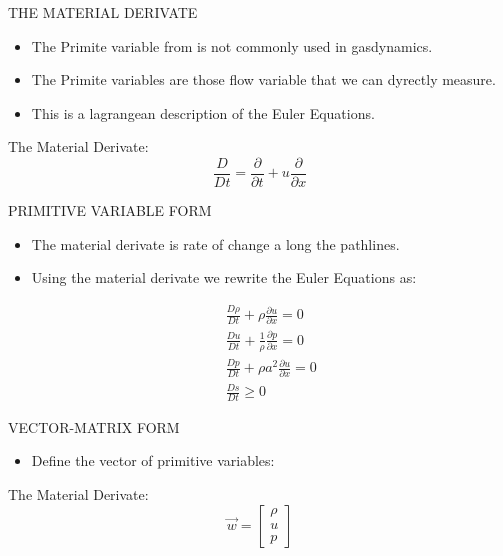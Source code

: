 \documentclass{beamer}
\begin{document}
\begin{frame}{THE MATERIAL DERIVATE}
  \begin{itemize}
   \item The Primite variable from is not commonly used in gasdynamics. 
   \item The Primite variables are those flow variable that we can dyrectly measure.
   \item This is a lagrangean description of the Euler Equations.
  \end{itemize}
The Material Derivate:
  \begin{equation}
   \frac{D}{Dt}=\frac{\partial}{\partial{t}}+u\frac{\partial}{\partial{x}}
  \end{equation}
\end{frame}

\begin{frame}{PRIMITIVE VARIABLE FORM}
  \begin{itemize}
   \item The material derivate is rate of change a long the pathlines.
   \item Using the material derivate we rewrite the Euler Equations as:
  \end{itemize}
  \begin{eqnarray}
    &&\frac{D\rho}{Dt}+\rho\frac{\partial{u}}{\partial{x}}=0 \\
    &&\frac{Du}{Dt}+\frac{1}{\rho}\frac{\partial{p}}{\partial{x}}=0 \\
    &&\frac{Dp}{Dt}+{\rho}a^2\frac{\partial{u}}{\partial{x}}=0 \\
    &&\frac{Ds}{Dt}\geq 0
  \end{eqnarray}
\end{frame}

\begin{frame}{VECTOR-MATRIX FORM}
  \begin{itemize}
   \item Define the vector of primitive variables:
  \end{itemize}
The Material Derivate:
  \begin{equation}
   \vec{w}=\begin{bmatrix}
   \rho\\ 
   u\\ 
   p
   \end{bmatrix}
  \end{equation}
\end{frame}
\end{document}
